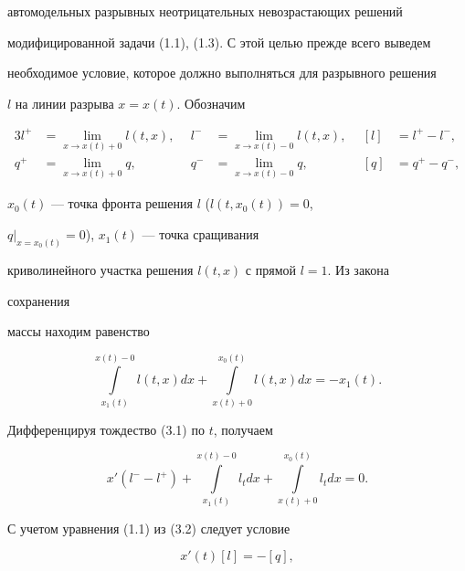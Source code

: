 автомодельных разрывных неотрицательных невозрастающих решений 


модифицированной задачи (1.1), (1.3). С этой целью прежде всего выведем 


необходимое условие, которое должно выполняться для разрывного решения 


$l$ на линии разрыва $x=x(t)$. Обозначим 


\begin{alignat*}{3} 


l^+&=\lim_{x\to x(t)+0}l(t,x), 


&\ \ l^-&=\lim_{x\to x(t)-0}l(t,x), 


&\ \ [l]&=l^+-l^-, \\ 


q^+&=\lim_{x\to x(t)+0}q, &\ \ q^-&=\lim_{x\to x(t)-0}q, 


&\ \ [q]&=q^+-q^-, 


\end{alignat*} 


$x_0(t)$ --- точка фронта решения $l$ ($l(t,x_0(t))=0$, 


$q|_{x=x_0(t)}=0$), $x_1(t)$ --- точка сращивания 


криволинейного участка решения $l(t,x)$ с прямой $l=1$. Из закона 


сохранения 


массы находим равенство 


\begin{equation} 


\int\limits^{x(t)-0}_{x_1(t)}l(t,x)d x+ 


\int\limits^{x_0(t)}_{x(t)+0}l(t,x)d x=-x_1(t).\tag{3.1} 


\end{equation} 


Дифференцируя тождество (3.1) по $t$, получаем 


\begin{equation} 


x'(l^--l^+)+\int\limits^{x(t)-0}_{x_1(t)}l_t d x+ 


\int\limits^{x_0(t)}_{x(t)+0}l_t d x=0.\tag{3.2} 


\end{equation} 


С учетом уравнения (1.1) из (3.2) следует условие 


\begin{equation} 


x'(t)[l]=-[q],\tag{3.3} 


\end{equation} 


